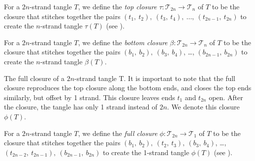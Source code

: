 \documentclass{ws-jktr}
\begin{document}
\begin{definition}
For a $2n$-strand tangle $T$, we define the
\textit{top closure} $\tau:\mathcal{T}_{2n}\to\mathcal{T}_n$ of $T$ to be the
closure that stitches together the pairs
$(t_1,~t_2),~(t_3,~t_4),~\dots,~(t_{2n-1},~t_{2n})$ to create the $n$-strand
tangle $\tau(T)$ (see \figTop).
\end{definition}
\vspace{-2em}
\begin{definition}
For a $2n$-strand tangle $T$, we define the
\textit{bottom closure} $\beta:\mathcal{T}_{2n}\to\mathcal{T}_n$ of $T$ to be
the closure that stitches together the pairs $(b_1,~b_2),~(b_3,~b_4)$, \dots,
$(b_{2n-1},~b_{2n})$ to create the $n$-strand tangle $\beta(T)$.
\end{definition}

{The full closure of a $2n$-strand tangle T.
It is important to note that the full closure reproduces the top closure along
the bottom ends, and closes the top ends similarly, but offset by 1 strand.
This closure leaves ends $t_1$ and $t_{2n}$ open.
After the closure, the tangle has only 1 strand instead of $2n$.
We denote this closure $\phi(T)$.}\\

\vspace{-2em}\begin{definition}
For a $2n$-strand tangle $T$, we define the
\textit{full closure} $\phi:\mathcal{T}_{2n}\to\mathcal{T}_1$ of $T$ to be the
closure that stitches together the pairs $(b_1,~b_2),~(t_2,~t_3),~(b_3,~b_4)$,
\dots, $(t_{2n-2},~t_{2n-1}),~(b_{2n-1},~b_{2n})$ to create the 1-strand tangle
$\phi(T)$ (see \figFull).
\end{definition}
\end{document}
